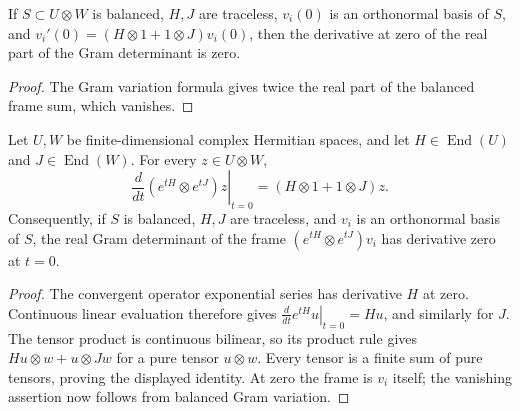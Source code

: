 \begin{lemma}
\label{lem:balanced-gram-variation-zero}
\leanok
If $S\subset U\otimes W$ is balanced, $H,J$ are traceless,
$v_i(0)$ is an orthonormal basis of $S$, and
$v_i'(0)=(H\otimes1+1\otimes J)v_i(0)$, then the derivative at zero
of the real part of the Gram determinant is zero.
\end{lemma}
\begin{proof}
The Gram variation formula gives twice the real part of the balanced
frame sum, which vanishes.
\end{proof}

\begin{lemma}
\label{lem:balanced-exponential-variation}
\leanok
Let $U,W$ be finite-dimensional complex Hermitian spaces, and let
$H\in\operatorname{End}(U)$ and $J\in\operatorname{End}(W)$.
For every $z\in U\otimes W$,
\[
 \left.\frac{d}{dt}(e^{tH}\otimes e^{tJ})z\right|_{t=0}
   =(H\otimes1+1\otimes J)z.
\]
Consequently, if $S$ is balanced, $H,J$ are traceless, and $v_i$ is an
orthonormal basis of $S$, the real Gram determinant of the frame
$(e^{tH}\otimes e^{tJ})v_i$ has derivative zero at $t=0$.
\end{lemma}
\begin{proof}
The convergent operator exponential series has derivative $H$ at zero.
Continuous linear evaluation therefore gives
$\left.\frac{d}{dt}e^{tH}u\right|_{t=0}=Hu$, and similarly for $J$.
The tensor product is continuous bilinear, so its product rule gives
$Hu\otimes w+u\otimes Jw$ for a pure tensor $u\otimes w$.
Every tensor is a finite sum of pure tensors, proving the displayed
identity. At zero the frame is $v_i$ itself; the vanishing assertion
now follows from balanced Gram variation.
\end{proof}

